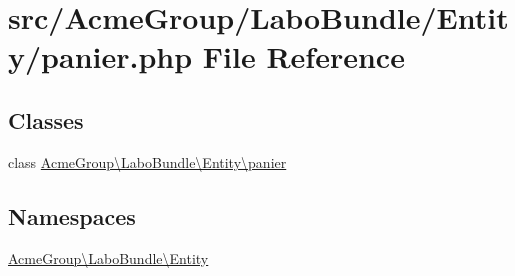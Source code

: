 \hypertarget{_labo_bundle_2_entity_2panier_8php}{\section{src/\+Acme\+Group/\+Labo\+Bundle/\+Entity/panier.php File Reference}
\label{_labo_bundle_2_entity_2panier_8php}
}
\subsection*{Classes}
\begin{DoxyCompactItemize}
\item 
class \hyperlink{class_acme_group_1_1_labo_bundle_1_1_entity_1_1panier}{Acme\+Group\textbackslash{}\+Labo\+Bundle\textbackslash{}\+Entity\textbackslash{}panier}
\end{DoxyCompactItemize}
\subsection*{Namespaces}
\begin{DoxyCompactItemize}
\item 
 \hyperlink{namespace_acme_group_1_1_labo_bundle_1_1_entity}{Acme\+Group\textbackslash{}\+Labo\+Bundle\textbackslash{}\+Entity}
\end{DoxyCompactItemize}
